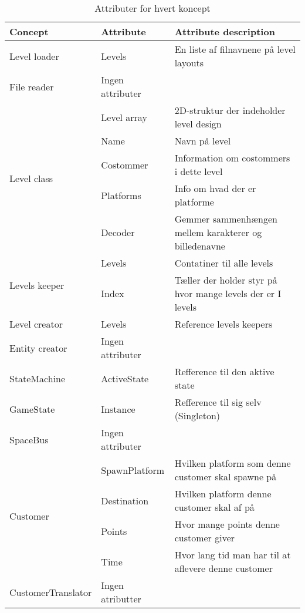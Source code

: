 \begin{table}[!h]
\hspace{-50pt}
\begin{tabular}{|l|l|l|}
\hline
\textbf{Concept}               & \textbf{Attribute} & \textbf{Attribute description}                              \\ \hline
Level loader                   & Levels             & En liste af filnavnene på level layouts                     \\ \hline
File reader                    & Ingen attributer   &                                                             \\ \hline
\multirow{5}{*}{Level class}   & Level array        & 2D-struktur der indeholder level design                     \\ \cline{2-3}
                               & Name               & Navn på level                                               \\ \cline{2-3}
                               & Costommer          & Information om costommers i dette level                     \\ \cline{2-3}
                               & Platforms          & Info om hvad der er platforme                               \\ \cline{2-3}
                               & Decoder            & Gemmer sammenhængen mellem karakterer og billedenavne       \\ \hline
\multirow{2}{*}{Levels keeper} & Levels             & Contatiner til alle levels                                  \\ \cline{2-3}
                               & Index              & Tæller der holder styr på hvor mange levels der er I levels \\ \hline
Level creator                  & Levels             & Reference levels keepers                                    \\ \hline
Entity creator                 & Ingen attributer   &                                                             \\ \hline
StateMachine & ActiveState & Refference til den aktive state \\\hline
GameState & Instance & Refference til sig selv (Singleton)\\\hline
SpaceBus & Ingen attributer & \\\hline
\multirow{4}{*}{Customer}   & SpawnPlatform        & Hvilken platform som denne customer skal spawne på                     
\\ \cline{2-3}
&Destination & Hvilken platform denne customer skal af på \\ \cline{2-3}
&Points &Hvor mange points denne customer giver \\ \cline{2-3}
&Time &Hvor lang tid man har til at aflevere denne customer \\ \hline
CustomerTranslator & Ingen atributter \\ \hline
\end{tabular}
\caption{Attributer for hvert koncept}
\label{attributes}
\end{table}


